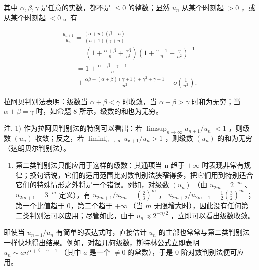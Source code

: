 其中 \(\alpha, \beta, \gamma\) 是任意的实数，都不是 \(\leqslant 0\) 的整数；显然 \(u_{n}\) 从某个时刻起 \(>0\) ，或从某个时刻起 \(< 0\) 。有

\[
\begin{array}{l} \frac {u _ {n + 1}}{u _ {n}} = \frac {(\alpha + n) (\beta + n)}{(n + 1) (\gamma + n)} \\ \qquad = \left(1 + \frac {\alpha + \beta}{n} + \frac {\alpha \beta}{n ^ {2}}\right) \left(1 + \frac {\gamma + 1}{n} + \frac {\gamma}{n ^ {2}}\right) ^ {- 1} \\ \qquad = 1 + \frac {\alpha + \beta - \gamma - 1}{n} \\ \qquad + \frac {\alpha \beta - (\alpha + \beta) (\gamma + 1) + \gamma^ {2} + \gamma + 1}{n ^ {2}} + o \left(\frac {1}{n ^ {2}}\right). \end{array}
\]

拉阿贝判别法表明：级数当 \(\alpha +\beta <  \gamma\) 时收敛，当 \(\alpha +\beta >\gamma\) 时和为无穷；当 \(\alpha +\beta = \gamma\) 时，如命题 8 所示，级数的和也为无穷。

注. 1) 作为拉阿贝判别法的特例可以看出：若 \(\limsup_{n\to \infty}u_{n + 1} / u_n\) \(< 1\) ，则级数 \((u_{n})\) 收敛；反之，若 \(\liminf_{n\to \infty}u_{n + 1} / u_n > 1\) ，则级数 \((u_{n})\) 的和为无穷（达朗贝尔判别法）。

\begin{enumerate}
\def\labelenumi{\arabic{enumi})}
\setcounter{enumi}{1}
\tightlist
\item
  第二类判别法只能应用于这样的级数：其通项当 n 趋于 \(+\infty\) 时表现非常有规律；换句话说，它们的适用范围比对数判别法狭窄得多，把它们用到特别适合它们的特殊情形之外将是一个错误。例如，对级数 \((u_{n})\) （由 \(u_{2m} = 2^{-m}\) 、 \(u_{2m + 1} = 3^{-m}\) 定义），有 \(u_{2m + 1} / u_{2m} = \left(\frac{2}{3}\right)^{m}\) ， \(u_{2m + 2} / u_{2m + 1} = \frac{1}{2}\left(\frac{3}{2}\right)^{m}\) ；第一个比值趋于 0，第二个趋于 \(+\infty\) （当 \(m\) 无限增大时），因此没有任何第二类判别法可以应用；尽管如此，由于 \(u_{n} \preccurlyeq 2^{-n / 2}\) ，立即可以看出级数收敛。
\end{enumerate}

即使当 \(u_{n+1} / u_n\) 有简单的表达式时，直接估计 \(u_n\) 的主部也常常与第二类判别法一样快地得出结果。例如，对超几何级数，斯特林公式立即表明 \(u_n \sim a n^{\alpha + \beta - \gamma - 1}\) （其中 \(a\) 是一个 \(\neq 0\) 的常数），于是 0 阶对数判别法便可应用。

\appendix
\renewcommand{\thechapter}{}
\renewcommand{\thesection}{\arabic{section}}

